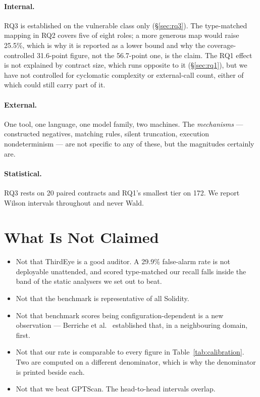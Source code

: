 \documentclass[sigconf,nonacm]{acmart}
\newcommand{\tool}{ThirdEye}
\begin{document}
\paragraph{Internal.}
RQ3 is established on the vulnerable class only (\S\ref{sec:rq3}). The
type-matched mapping in RQ2 covers five of eight roles; a more generous map would
raise 25.5\%, which is why it is reported as a lower bound and why the
coverage-controlled 31.6-point figure, not the 56.7-point one, is the claim. The
RQ1 effect is not explained by contract size, which runs opposite to it
(\S\ref{sec:rq1}), but we have not controlled for cyclomatic complexity or
external-call count, either of which could still carry part of it.

\paragraph{External.}
One tool, one language, one model family, two machines. The \emph{mechanisms} ---
constructed negatives, matching rules, silent truncation, execution
nondeterminism --- are not specific to any of these, but the magnitudes certainly
are.

\paragraph{Statistical.}
RQ3 rests on 20 paired contracts and RQ1's smallest tier on 172. We report Wilson
intervals throughout and never Wald.

\section{What Is Not Claimed}

\begin{itemize}
\item Not that \tool{} is a good auditor. A 29.9\% false-alarm rate is not
  deployable unattended, and scored type-matched our recall falls inside the band
  of the static analysers we set out to beat.
\item Not that the benchmark is representative of all Solidity.
\item Not that benchmark scores being configuration-dependent is a new
  observation --- Berriche et al.~\cite{berriche} established that, in a
  neighbouring domain, first.
\item Not that our rate is comparable to every figure in
  Table~\ref{tab:calibration}. Two are computed on a different denominator, which
  is why the denominator is printed beside each.
\item Not that we beat GPTScan. The head-to-head intervals overlap.
\end{itemize}
\end{document}
